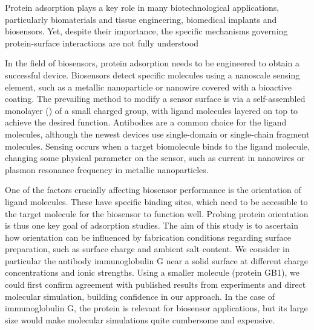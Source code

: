 
Protein adsorption plays a key role in many biotechnological applications, particularly biomaterials and tissue engineering, biomedical implants and biosensors.
Yet, despite their importance, the specific mechanisms governing protein-surface interactions are not fully understood\cite{Gray2004,RabeVerdesSeegel2011}

In the field of biosensors, protein adsorption needs to be engineered to obtain a successful device. 
Biosensors detect specific molecules using a nanoscale sensing element, such as a metallic nanoparticle or nanowire covered with a bioactive coating. 
The prevailing method to modify a sensor surface is via a self-assembled monolayer (\sam) of a small charged group, with ligand molecules layered on top to achieve the desired function. 
Antibodies are a common choice for the ligand molecules, although the newest devices use single-domain or single-chain fragment molecules.\cite{ByunETal2013,TrillingETal2014} 
Sensing occurs when a target biomolecule binds to the ligand molecule,  changing some physical parameter on the sensor, such as current in nanowires or plasmon resonance frequency in metallic nanoparticles. 

One of the factors crucially affecting biosensor performance is the orientation of ligand molecules.\cite{TajimaTakaiIshihara2011,TrillingBeekwilderZuilhof2013} 
These have specific binding sites, which need to be accessible to the target molecule for the biosensor to function well.
Probing protein orientation is thus one key goal of adsorption studies.
The aim of this study is to ascertain how orientation can be influenced by fabrication conditions regarding surface preparation, such as surface charge and ambient salt content. We consider in particular the antibody immunoglobulin G near a solid surface at different charge concentrations and ionic strengths. Using a smaller molecule (protein GB1), we could first confirm agreement with published results from experiments and direct molecular simulation, building confidence in our approach. In the case of immunoglobulin G, the protein is relevant for biosensor applications, but its large size would make molecular simulations quite cumbersome and expensive.


